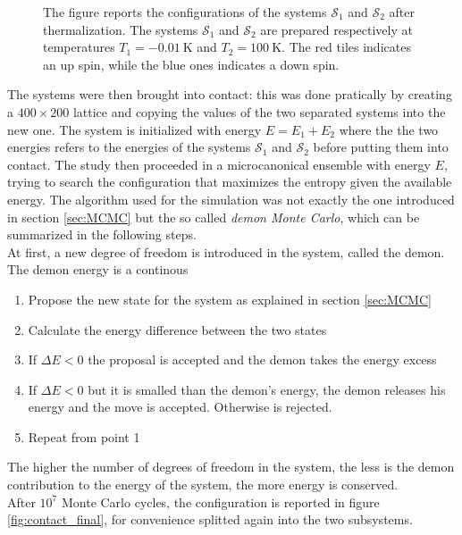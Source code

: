 \begin{figure}
\begin{minipage}[c]{0.45\textwidth}
    \end{minipage}
    \caption{The figure reports the configurations of the systems $\mathcal{S}_1$ and $\mathcal{S}_2$ after thermalization. The systems $\mathcal{S}_1$ and $\mathcal{S}_2$ are prepared respectively at temperatures $T_1 = \SI{-0.01}{\kelvin}$ and $T_2 = \SI{100}{\kelvin}$. The red tiles indicates an up spin, while the blue ones indicates a down spin.}
    \label{fig:contact_initial}
\end{figure}
\vspace{10pt}
The systems were then brought into contact: this was done pratically by creating a $400 \times 200$ lattice and copying the values of the two separated systems into the new one. The system is initialized 
with energy $E = E_1 + E_2$ where the the two energies refers to the energies of the systems $\mathcal{S}_1$ and $\mathcal{S}_2$ before putting them into contact. The study then proceeded in a microcanonical ensemble 
with energy $E$, trying to search the configuration that maximizes the entropy given the available energy. The algorithm used for the simulation was not exactly the one introduced in section \ref{sec:MCMC} but the so called \emph{demon Monte Carlo}, which can be summarized in the following steps. \\
At first, a new degree of freedom is introduced in the system, called the demon. The demon energy is a continous
\begin{enumerate}
    \item Propose the new state for the system as explained in section \ref{sec:MCMC}
    \item Calculate the energy difference between the two states
    \item If $\Delta E < 0$ the proposal is accepted and the demon takes the energy excess
    \item If $\Delta E < 0$ but it is smalled than the demon's energy, the demon releases his energy and the move is accepted. Otherwise is rejected.
    \item Repeat from point 1
\end{enumerate}
The higher the number of degrees of freedom in the system, the less is the demon contribution to the energy of the system, the more energy is conserved. \\
After $10^7$ Monte Carlo cycles, the configuration is reported in figure \ref{fig:contact_final}, for convenience splitted again into the two subsystems.
